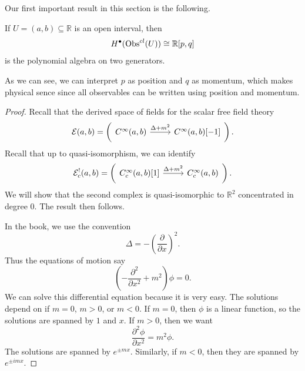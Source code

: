 Our first important result in this section is the following.
\begin{lemma}\label{lma:4.4.1}
	If $U=(a,b)\subseteq \mathbb{R} $ is an open interval, then
	\[
		H^{\bullet} (\operatorname{Obs}^{cl} (U))\cong \mathbb{R} [p,q]
	\]
	is the polynomial algebra on two generators.
\end{lemma}
As we can see, we can interpret $p$ as position and $q$ as momentum, which makes physical sence since all observables can be written using position and momentum.
\begin{proof}
Recall that the derived space of fields for the scalar free field theory
\[\mathcal{E}(a,b) = \left(\begin{tikzcd}[row sep = 2.5em, column sep = 2.5em]
	C^\infty (a,b)\ar[" \Delta +m^2 ", r]  & C^\infty (a,b)[-1]
\end{tikzcd}\right).\]
Recall that up to quasi-isomorphism, we can identify
\[\mathcal{E} _c^!(a,b) = \left(\begin{tikzcd}[row sep = 2.5em, column sep = 2.5em]
	C^\infty_c(a,b)[1]\ar[" \Delta +m^2 ", r]  & C^\infty _c(a,b)
\end{tikzcd}\right).\]
We will show that the second complex is quasi-isomorphic to $\mathbb{R} ^2$ concentrated in degree 0. The result then follows.

In the book, we use the convention
\[
\Delta =-\left( \frac{\partial }{\partial x}  \right) ^2
.\]
Thus the equations of motion say
\[
	\left( -\frac{\partial ^2}{\partial x^2} +m^2 \right) \phi =0
.\]
We can solve this differential equation because it is very easy. The solutions depend on if $m=0$, $m>0$, or $m<0$. If $m=0$, then $\phi $ is a linear function, so the solutions are spanned by $1$ and $x$. If $m>0$, then we want
\[
	\frac{\partial ^2\phi }{\partial x^2} =m^2\phi 
.\]
The solutions are spanned by $e^{\pm mx} $. Similarly, if $m<0$, then they are spanned by $e^{\pm i mx} $.


\end{proof}
